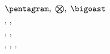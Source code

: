 \documentclass{article}
\begin{document}
   $ \pentagram,\;\bigotimes,\;\bigoast $\\[6pt]
   \FiveStar, \FiveStarCenterOpen, \FiveStarConvex \\[6pt]
   \EightStar, \EightStarTaper, \SixStar \\[6pt]
   , , , 
\end{document}
